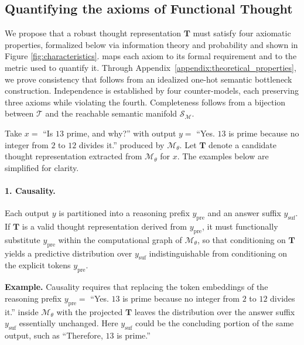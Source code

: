 \subsection{Quantifying the axioms of Functional Thought}

We propose that a robust thought representation $\mathbf{T}$ must satisfy four axiomatic properties, formalized below via information theory and probability and shown in Figure \ref{fig:characteristics}.  maps each axiom to its formal requirement and to the metric used to quantify it. Through Appendix~\ref{appendix:theoretical_properties}, we prove consistency that follows from an idealized one-hot semantic bottleneck construction. Independence is established by four counter-models, each preserving three axioms while violating the fourth. Completeness follows from a bijection between $\mathcal{T}$ and the reachable semantic manifold $\mathcal{S}_\mathcal{M}$.

\begin{runex}
Take $x =$ ``Is $13$ prime, and why?'' with output
$y =$ ``Yes. $13$ is prime because no integer from $2$ to $12$ divides it.''
produced by $\mathcal{M}_\theta$. Let $\mathbf{T}$ denote a candidate thought
representation extracted from $\mathcal{M}_\theta$ for $x$. The examples below
are simplified for clarity.
\end{runex}

\paragraph{1. Causality.}
Each output $y$ is partitioned into a reasoning prefix $y_{\mathrm{pre}}$ and an answer suffix $y_{\mathrm{suf}}$. If $\mathbf{T}$ is a valid thought representation derived from $y_{\mathrm{pre}}$, it must functionally substitute $y_{\mathrm{pre}}$ within the computational graph of $\mathcal{M}_\theta$, so that conditioning on $\mathbf{T}$ yields a predictive distribution over $y_{\mathrm{suf}}$ indistinguishable from conditioning on the explicit tokens $y_{\mathrm{pre}}$.

\textbf{Example.} Causality requires that replacing the token embeddings of
the reasoning prefix $y_{\mathrm{pre}} =$ ``Yes. $13$ is prime because no integer from $2$ to $12$ divides it.''
inside $\mathcal{M}_\theta$ with the projected $\mathbf{T}$ leaves the
distribution over the answer suffix $y_{\mathrm{suf}}$ essentially unchanged.
Here $y_{\mathrm{suf}}$ could be the concluding portion of the same output, such as ``Therefore, $13$ is prime.''

